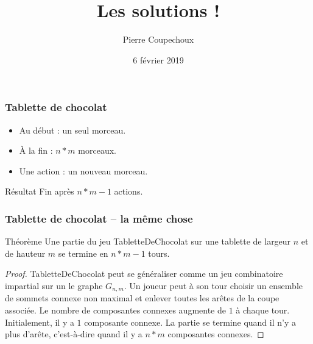 \documentclass{beamer}
\title{Les solutions !}
\date{6 février 2019}
\author{Pierre Coupechoux}
\begin{document}
\begin{frame}
	\maketitle
\end{frame}

\begin{frame}
	\frametitle{Tablette de chocolat}
	\begin{center}
	\end{center}
	\begin{itemize}
		\item Au début : un seul morceau.
		\item À la fin : $n*m$ morceaux.
		\item Une action : un nouveau morceau.
	\end{itemize}
	\begin{block}{Résultat}
		Fin après $n*m-1$ actions.
	\end{block}
\end{frame}
\begin{frame}
	\frametitle{Tablette de chocolat -- la même chose}
	\begin{block}{Théorème}
		Une partie du jeu {\sc TabletteDeChocolat} sur une tablette de largeur $n$ et de hauteur $m$ se termine en $n*m-1$ tours.
	\end{block}
	\begin{proof}
		{\sc TabletteDeChocolat} peut se généraliser comme un jeu combinatoire impartial sur un le graphe $G_{n,m}$. Un joueur peut à son tour choisir un ensemble de sommets connexe non maximal et enlever toutes les arêtes de la coupe associée. Le nombre de composantes connexes augmente de $1$ à chaque tour.
	Initialement, il y a $1$ composante connexe. La partie se termine quand il n'y a plus d'arête, c'est-à-dire quand il y a $n*m$ composantes connexes.
	\end{proof}
\end{frame}
\end{document}
